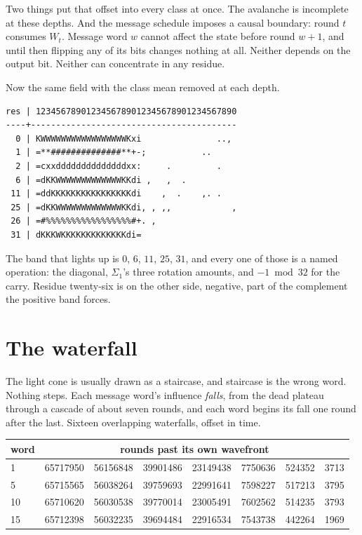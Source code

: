 Two things put that offset into every class at once. The avalanche is incomplete at these depths.
And the message schedule imposes a causal boundary: round \(t\) consumes \(W_t\). Message word
\(w\) cannot affect the state before round \(w+1\), and until then flipping any of its bits changes
nothing at all. Neither depends on the output bit. Neither can concentrate in any residue.

Now the same field with the class mean removed at each depth.

\begin{verbatim}
res | 1234567890123456789012345678901234567890
----+-----------------------------------------
  0 | KWWWWWWWWWWWWWWWWWKxi               ..,
  1 | =**##############**+-;           ..
  2 | =cxxddddddddddddddxx:     .         .
  6 | =dKKWWWWWWWWWWWWWKKdi ,   ,  .
 11 | =ddKKKKKKKKKKKKKKKKdi    ,  .    ,. .
 25 | =dKKWWWWWWWWWWWWWKKdi, , ,,            ,
 26 | =#%%%%%%%%%%%%%%%%%#+. ,
 31 | dKKKWKKKKKKKKKKKKKdi=
\end{verbatim}

The band that lights up is \(0\), \(6\), \(11\), \(25\), \(31\), and every one of those is a named
operation: the diagonal, \(\Sigma_1\)'s three rotation amounts, and \(-1 \bmod 32\) for the
carry. Residue twenty-six is on the other side, negative, part of the complement the positive band
forces.

\section{The waterfall}

The light cone is usually drawn as a staircase, and staircase is the wrong word. Nothing steps. Each
message word's influence \emph{falls}, from the dead plateau through a cascade of about seven
rounds, and each word begins its fall one round after the last. Sixteen overlapping waterfalls,
offset in time.

\begin{center}
\begin{tabular}{lrrrrrrr}
\toprule
word & \multicolumn{7}{c}{rounds past its own wavefront} \\
\midrule
1 & 65717950 & 56156848 & 39901486 & 23149438 & 7750636 & 524352 & 3713 \\
5 & 65715565 & 56038264 & 39759693 & 22991641 & 7598227 & 517213 & 3795 \\
10 & 65710620 & 56030538 & 39770014 & 23005491 & 7602562 & 514235 & 3793 \\
15 & 65712398 & 56032235 & 39694484 & 22916534 & 7543738 & 442264 & 1969 \\
\bottomrule
\end{tabular}
\end{center}

